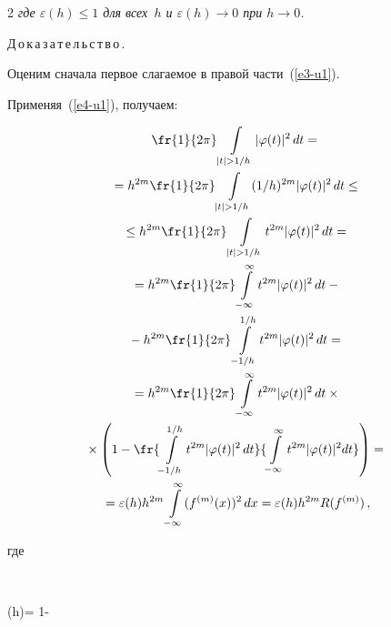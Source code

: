 \begin{multicols}{2}
\textit{где $\varepsilon(h)\le1$ для всех~$h$ и $\varepsilon(h)\to0$ при $h\to0$.}



\medskip



\noindent

Д\,о\,к\,а\,з\,а\,т\,е\,л\,ь\,с\,т\,в\,о\,.\ 

Оценим сначала первое слагаемое в правой части~(\ref{e3-u1}).

Применяя~(\ref{e4-u1}), получаем:

\begin{multline*}

\fr{1}{2\pi}\int\limits_{|t|>1/h}|\varphi(t)|^2\,dt={}\\

{}=

h^{2m}\fr{1}{2\pi}\int\limits_{|t|>1/h}(1/h)^{2m}|\varphi(t)|^2\,dt\le{}\\

{}\le h^{2m}\fr{1}{2\pi}\int\limits_{|t|>1/h}t^{2m}|\varphi(t)|^2\,dt={}\\

{}=

h^{2m}\fr{1}{2\pi}\int\limits_{-\infty}^\infty t^{2m}|\varphi(t)|^2\,dt-{}\\

{}-

h^{2m}\fr{1}{2\pi}\int\limits_{-1/h}^{1/h} t^{2m}|\varphi(t)|^2\,dt

={}\\

{}=

h^{2m}\fr{1}{2\pi}\int\limits_{-\infty}^\infty t^{2m}|\varphi(t)|^2\,dt\times{}\\

{}\times

\left(1-\fr{\int\limits_{-1/h}^{1/h}

t^{2m}|\varphi(t)|^2\,dt}{\int\limits_{-\infty}^\infty t^{2m}|\varphi(t)|^2dt}

\right)={}\\

{}=\varepsilon(h)h^{2m}\int\limits_{-\infty}^\infty(f^{(m)}(x))^2\,dx=

\varepsilon(h)h^{2m}R(f^{(m)})\,,

\end{multline*}

где

$$

\varepsilon(h)= 1-
\end{multicols}

